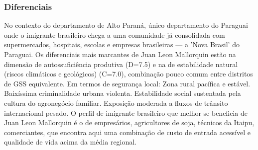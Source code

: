 \subsubsection*{Diferenciais}\label{dif-juan-leon-mallorquin-1011}
No contexto do departamento de Alto Paraná, único departamento do Paraguai onde o imigrante brasileiro chega a uma comunidade já consolidada com supermercados, hospitais, escolas e empresas brasileiras — a 'Nova Brasil' do Paraguai. Os diferenciais mais marcantes de Juan Leon Mallorquin estão na dimensão de autossuficiência produtiva (D=7.5) e na de estabilidade natural (riscos climáticos e geológicos) (C=7.0), combinação pouco comum entre distritos de GSS equivalente. Em termos de segurança local: Zona rural pacífica e estável. Baixíssima criminalidade urbana violenta. Estabilidade social sustentada pela cultura do agronegócio familiar. Exposição moderada a fluxos de trânsito internacional pesado. O perfil de imigrante brasileiro que melhor se beneficia de Juan Leon Mallorquin é o de empresários, agricultores de soja, técnicos da Itaipu, comerciantes, que encontra aqui uma combinação de custo de entrada acessível e qualidade de vida acima da média regional.

